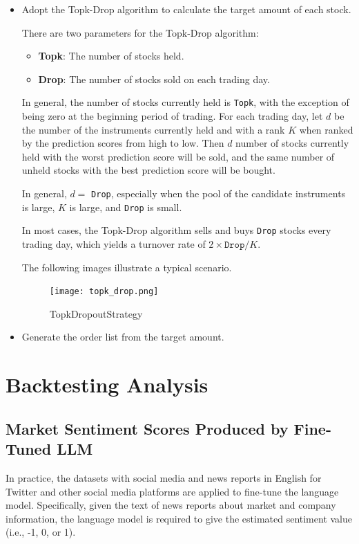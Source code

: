 \documentclass[conference]{IEEEtran}
\begin{document}
\begin{itemize}
    \item Adopt the Topk-Drop algorithm to calculate the target amount of each stock.
    
    There are two parameters for the Topk-Drop algorithm:
    \begin{itemize}
        \item \textbf{Topk}: The number of stocks held.
        \item \textbf{Drop}: The number of stocks sold on each trading day.
    \end{itemize}
    
    In general, the number of stocks currently held is \texttt{Topk}, with the exception of being zero at the beginning period of trading. For each trading day, let $d$ be the number of the instruments currently held and with a rank $K$ when ranked by the prediction scores from high to low. Then $d$ number of stocks currently held with the worst prediction score will be sold, and the same number of unheld stocks with the best prediction score will be bought.
    
    In general, $d=$ \texttt{Drop}, especially when the pool of the candidate instruments is large, $K$ is large, and \texttt{Drop} is small.
    
    In most cases, the Topk-Drop algorithm sells and buys \texttt{Drop} stocks every trading day, which yields a turnover rate of $2 \times \texttt{Drop} / K$.
    
    The following images illustrate a typical scenario.
    \begin{figure}[h]
        \centering
        \texttt{[image: topk\_drop.png]}
        \caption{TopkDropoutStrategy}
        \label{fig:TopkDropoutStrategy}
    \end{figure}
    \item Generate the order list from the target amount.
\end{itemize}

\section{\textbf{Backtesting Analysis}}
\subsection{\textbf{Market Sentiment Scores Produced by Fine-Tuned LLM}}

In practice, the datasets with social media and news reports in English for Twitter and other social media platforms are applied to fine-tune the language model. Specifically, given the text of news reports about market and company information, the language model is required to give the estimated sentiment value (i.e., -1, 0, or 1).
\end{document}
